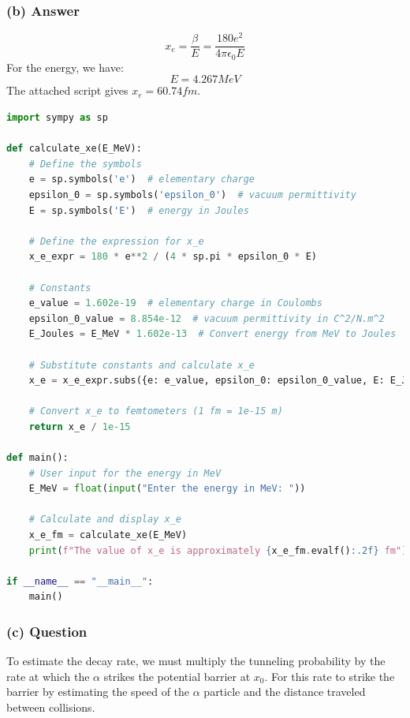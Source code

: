 \documentclass{article}
\begin{document}
\subsubsection*{(b) Answer}
\begin{equation}
    x_e = \frac{\beta}{E} = \frac{180e^2}{4\pi \epsilon_0 E}
\end{equation}
For the energy, we have:
\begin{equation}
    E = 4.267 MeV
\end{equation}
The attached script gives $x_e = 60.74 fm$.
\begin{lstlisting}[language=Python]
import sympy as sp

def calculate_xe(E_MeV):
    # Define the symbols
    e = sp.symbols('e')  # elementary charge
    epsilon_0 = sp.symbols('epsilon_0')  # vacuum permittivity
    E = sp.symbols('E')  # energy in Joules

    # Define the expression for x_e
    x_e_expr = 180 * e**2 / (4 * sp.pi * epsilon_0 * E)

    # Constants
    e_value = 1.602e-19  # elementary charge in Coulombs
    epsilon_0_value = 8.854e-12  # vacuum permittivity in C^2/N.m^2
    E_Joules = E_MeV * 1.602e-13  # Convert energy from MeV to Joules

    # Substitute constants and calculate x_e
    x_e = x_e_expr.subs({e: e_value, epsilon_0: epsilon_0_value, E: E_Joules})

    # Convert x_e to femtometers (1 fm = 1e-15 m)
    return x_e / 1e-15

def main():
    # User input for the energy in MeV
    E_MeV = float(input("Enter the energy in MeV: "))

    # Calculate and display x_e
    x_e_fm = calculate_xe(E_MeV)
    print(f"The value of x_e is approximately {x_e_fm.evalf():.2f} fm")

if __name__ == "__main__":
    main()

\end{lstlisting}

\subsubsection*{(c) Question}
To estimate the decay rate, we must multiply the tunneling probability by the rate at which the \( \alpha \) strikes the potential barrier at \( x_0 \). For this rate to strike the barrier by estimating the speed of the \( \alpha \) particle and the distance traveled between collisions.
\end{document}
